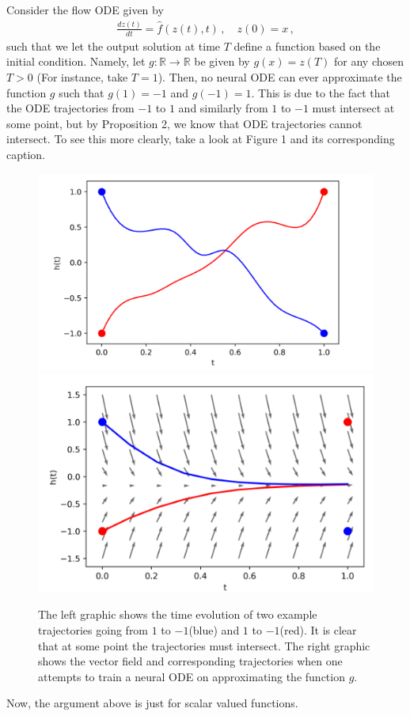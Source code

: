 \documentclass[12pt,letterpaper, onecolumn]{exam}
\theoremstyle{definition}
\begin{document}
Consider the flow ODE given by 
\begin{align}
    \frac{dz(t)}{dt} = \hat{f}(z(t), t)\,, \quad z(0) = x\,,
\end{align}
such that we let the output solution at time $T$ define a function based on the initial condition. Namely, let $g: \mathbb{R} \to \mathbb{R}$ be given by $g(x) = z(T)$ for any chosen $T > 0$ (For instance, take $T=1$). Then, no neural ODE can ever approximate the function $g$ such that $g(1) =-1$ and $g(-1) = 1$.  
This is due to the fact that the ODE trajectories from $-1$ to $1$ and similarly from $1$ to $-1$ must intersect at some point, but by Proposition 2, we know that ODE trajectories cannot intersect. To see this more clearly, take a look at Figure 1 and its corresponding caption. 
\begin{figure}
    \centering
    \includegraphics[width=0.4\linewidth]{left.png}
    \includegraphics[width=0.4\linewidth]{right.png}
    \caption{The left graphic shows the time evolution of two example trajectories going from $1$ to $-1$(blue) and $1$ to $-1$(red). It is clear that at some point the trajectories must intersect. The right graphic shows the vector field and corresponding trajectories when one attempts to train a neural ODE on approximating the function $g$. }
    \label{fig:enter-label}
\end{figure}

Now, the argument above is just for scalar valued functions. 
\end{document}
